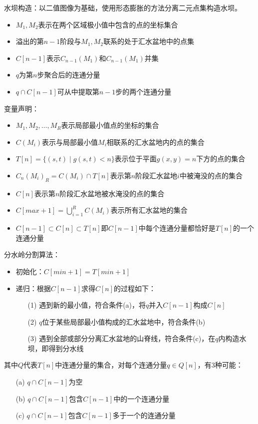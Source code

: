 水坝构造：以二值图像为基础，使用形态膨胀的方法分离二元点集构造水坝。
\begin{itemize}
	\item $M_1,M_2$表示在两个区域极小值中包含的点的坐标集合
	\item 溢出的第$n-1$阶段与$M_1,M_2$联系的处于汇水盆地中的点集
	\item $C[n-1]$表示$C_{n-1}(M_1)$和$C_{n-1}(M_1)$并集
	\item $q$为第$n$步聚合后的连通分量
	\item $q\cap C[n-1]$可从中提取第$n-1$步的两个连通分量
\end{itemize}

变量声明：
\begin{itemize}
	\item $M_1,M_2,\ldots,M_R$表示局部最小值点的坐标的集合
	\item $C(M_i)$表示与局部最小值$M_i$相联系的汇水盆地内的点的集合
	\item $T[n]=\{(s,t)\mid g(s,t)<n\}$表示位于平面$g(x,y)=n$下方的点的集合
	\item $C_n(M_i)_R=C(M_i)\cap T[n]$表示第$n$阶段汇水盆地$i$中被淹没的点的集合
	\item $C[n]$表示第$n$阶段汇水盆地被水淹没的点的集合
	\item $C[max+1]=\bigcup_{i=1}^R C(M_i)$表示所有汇水盆地的集合
	\item $C[n-1]\subset C[n]\subset T[n]$即$C[n-1]$中每个连通分量都恰好是$T[n]$的一个连通分量
\end{itemize}

分水岭分割算法：
\begin{itemize}
\item 初始化：$C[min+1]=T[min+1]$
\item 递归：根据$C[n-1]$求得$C[n]$的过程如下：
\begin{itemize}
	\item [(1)] 遇到新的最小值，符合条件(a)，将$q$并入$C[n-1]$构成$C[n]$
	\item [(2)] $q$位于某些局部最小值构成的汇水盆地中，符合条件(b)
    \item [(3)] 遇到全部或部分分离汇水盆地的山脊线，符合条件(c)，在$q$内构造水坝，即得到分水线
\end{itemize}
\end{itemize}
其中$Q$代表$T[n]$中连通分量的集合，对每个连通分量$q\in Q[n]$，有3种可能：
\begin{itemize}
	\item [(a)] $q\cap C[n-1]$为空
	\item [(b)] $q\cap C[n-1]$包含$C[n-1]$中的一个连通分量
	\item [(c)] $q\cap C[n-1]$包含$C[n-1]$多于一个的连通分量
\end{itemize}

